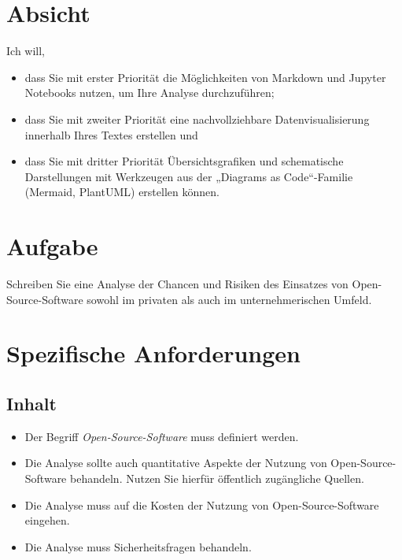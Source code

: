 \documentclass[
  nswissgerman,
  a4paper,
  DIV=11,
  numbers=noendperiod,
  ngerman]{scrreprt}
\providecommand{\tightlist}{%
  \setlength{\itemsep}{0pt}\setlength{\parskip}{0pt}}
\begin{document}
\section{Absicht}\label{absicht}

Ich will,

\begin{itemize}
\tightlist
\item
  dass Sie mit erster Priorität die Möglichkeiten von Markdown und
  Jupyter Notebooks nutzen, um Ihre Analyse durchzuführen;
\item
  dass Sie mit zweiter Priorität eine nachvollziehbare
  Datenvisualisierung innerhalb Ihres Textes erstellen und
\item
  dass Sie mit dritter Priorität Übersichtsgrafiken und schematische
  Darstellungen mit Werkzeugen aus der „Diagrams as Code``-Familie
  (Mermaid, PlantUML) erstellen können.
\end{itemize}

\section{Aufgabe}\label{aufgabe}

Schreiben Sie eine Analyse der Chancen und Risiken des Einsatzes von
Open-Source-Software sowohl im privaten als auch im unternehmerischen
Umfeld.

\section{Spezifische Anforderungen}\label{spezifische-anforderungen}

\subsection{Inhalt}\label{inhalt}

\begin{itemize}
\tightlist
\item
  Der Begriff \emph{Open-Source-Software} muss definiert werden.
\item
  Die Analyse sollte auch quantitative Aspekte der Nutzung von
  Open-Source-Software behandeln. Nutzen Sie hierfür öffentlich
  zugängliche Quellen.
\item
  Die Analyse muss auf die Kosten der Nutzung von Open-Source-Software
  eingehen.
\item
  Die Analyse muss Sicherheitsfragen behandeln.
\end{itemize}
\end{document}
